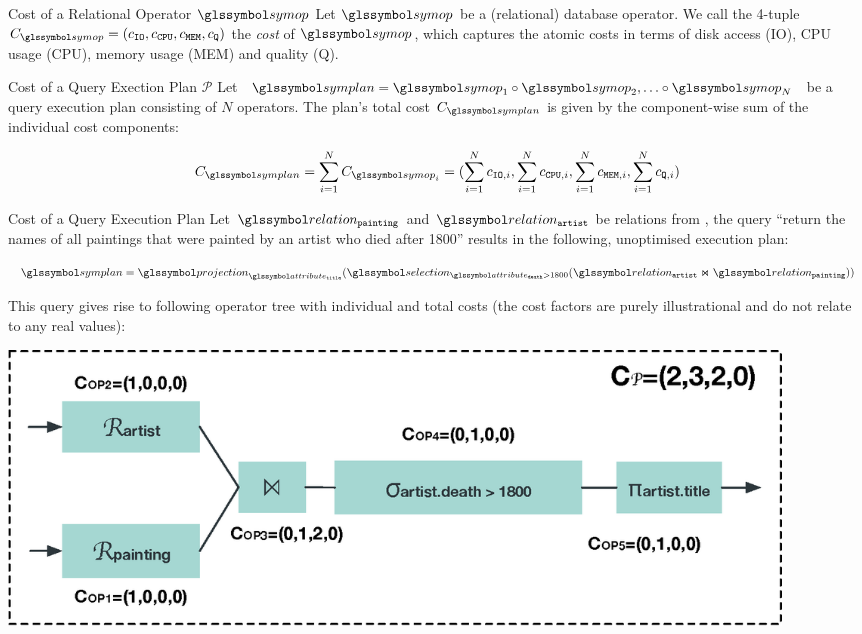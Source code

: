 \begin{definition}[label=definition:op_cost]{Cost of a Relational Operator $\symop$}{}
    Let $\symop$ be a (relational) database operator. We call the 4-tuple $C_{\symop} = (c_{\mathtt{IO}}, c_{\mathtt{CPU}}, c_{\mathtt{MEM}},c_{\mathtt{Q}})$ the \emph{cost} of $\symop$, which captures the atomic costs in terms of disk access (IO), CPU usage (CPU), memory usage (MEM) and quality (Q).
\end{definition}

\begin{definition}[label=definition:plan_cost]{Cost of a Query Exection Plan $\mathcal{P}$}{}
    Let $\symplan = \symop_1 \circ \symop_2, \ldots \circ \symop_N $ be a query execution plan consisting of $N$ operators. The plan's total cost $C_{\symplan}$ is given by the component-wise sum of the individual cost components:

    \begin{equation*}
        C_{\symplan} = \sum_{i=1}^{N} C_{\symop_i} = (\sum_{i=1}^{N} c_{\mathtt{IO},i}, \sum_{i=1}^{N} c_{\mathtt{CPU},i}, \sum_{i=1}^{N} c_{\mathtt{MEM},i}, \sum_{i=1}^{N} c_{\mathtt{Q},i})
    \end{equation*}
\end{definition}

\begin{example}[label=example:cost_model]{Cost of a Query Execution Plan}{}
    Let $\relation_{\mathtt{painting}}$ and $\relation_{\mathtt{artist}}$ be relations from , the query ``return the names of all paintings that were painted by an artist who died after 1800'' results in the following, unoptimised execution plan:

    \begin{equation*}
        \symplan= \projection_{\attribute_{\mathtt{title}}}(\selection_{\attribute_{\mathtt{death}} > 1800}(\relation_{\mathtt{artist}} \Join \relation_{\mathtt{painting}}))
    \end{equation*}

    This query gives rise to following operator tree with individual and total costs (the cost factors are purely illustrational and do not relate to any real values):

    \begin{center}
        \includegraphics[width=0.90\textwidth]{figures/cost_example.eps}
    \end{center}
\end{example}

